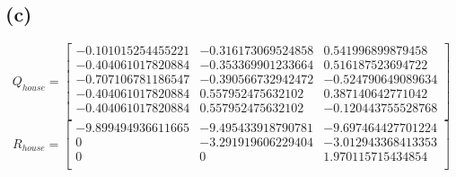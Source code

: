 \documentclass{article}
\begin{document}
        \subsection*{(c)}
            \begin{equation*}
                Q_{house} = \left[
                \begin{array}{ccccc}
                    -0.101015254455221 & -0.316173069524858 &  0.541996899879458\\
                    -0.404061017820884 & -0.353369901233664 &  0.516187523694722\\
                    -0.707106781186547 & -0.390566732942472 & -0.524790649089634\\
                    -0.404061017820884 &  0.557952475632102 &  0.387140642771042\\
                    -0.404061017820884 &  0.557952475632102 & -0.120443755528768\\
                \end{array}
                \right]
            \end{equation*}
            \begin{equation*}
                R_{house} = \left[    
                \begin{array}{ccc}
                    -9.899494936611665 & -9.495433918790781 & -9.697464427701224\\
                    0 & -3.291919606229404 & -3.012943368413353\\
                    0 &                  0 &  1.970115715434854\\
                \end{array}
                \right]
            \end{equation*}
\end{document}
